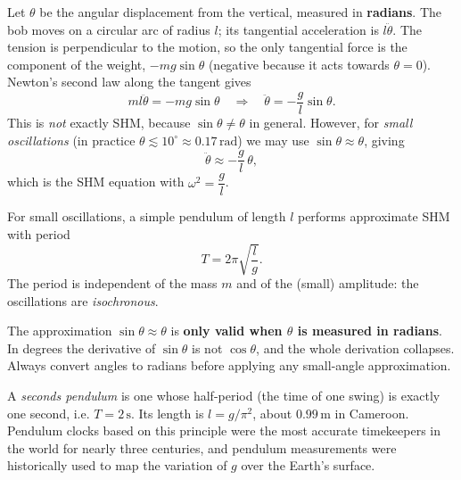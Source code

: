 \documentclass[11pt]{article}
\begin{document}
Let $\theta$ be the angular displacement from the vertical, measured in \textbf{radians}. The bob moves on a circular arc of radius $l$; its tangential acceleration is $l\ddot{\theta}$. The tension is perpendicular to the motion, so the only tangential force is the component of the weight, $-mg\sin\theta$ (negative because it acts towards $\theta = 0$). Newton's second law along the tangent gives
\[
m l \ddot{\theta} = -mg \sin\theta \quad \Rightarrow \quad \ddot{\theta} = -\frac{g}{l} \sin\theta.
\]
This is \emph{not} exactly SHM, because $\sin\theta \neq \theta$ in general. However, for \emph{small oscillations} (in practice $\theta \lesssim 10^\circ \approx 0.17\,\mathrm{rad}$) we may use $\sin\theta \approx \theta$, giving
\[
\ddot{\theta} \approx -\frac{g}{l}\,\theta,
\]
which is the SHM equation with $\omega^2 = \dfrac{g}{l}$.

\begin{propriete}
For small oscillations, a simple pendulum of length $l$ performs approximate SHM with period
\[
T = 2\pi \sqrt{\frac{l}{g}}.
\]
The period is independent of the mass $m$ and of the (small) amplitude: the oscillations are \emph{isochronous}.
\end{propriete}

\begin{attention}
The approximation $\sin\theta \approx \theta$ is \textbf{only valid when $\theta$ is measured in radians}. In degrees the derivative of $\sin\theta$ is not $\cos\theta$, and the whole derivation collapses. Always convert angles to radians before applying any small-angle approximation.
\end{attention}

\begin{savaistu}
A \emph{seconds pendulum} is one whose half-period (the time of one swing) is exactly one second, i.e. $T = 2\,\mathrm{s}$. Its length is $l = g/\pi^2$, about $0.99\,\mathrm{m}$ in Cameroon. Pendulum clocks based on this principle were the most accurate timekeepers in the world for nearly three centuries, and pendulum measurements were historically used to map the variation of $g$ over the Earth's surface.
\end{savaistu}
\end{document}
